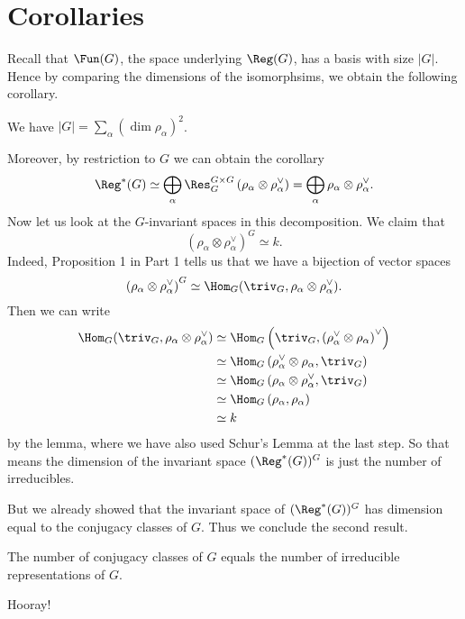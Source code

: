 \section{Corollaries}
Recall that $\Fun(G)$, the space underlying $\Reg(G)$, has a basis with size $\left\lvert G \right\rvert$.
Hence by comparing the dimensions of the isomorphsims, we obtain the following corollary.
\begin{theorem}
	We have $\left\lvert G \right\rvert = \sum_\alpha \left( \dim \rho_\alpha \right)^2$.
\end{theorem}
Moreover, by restriction to $G$ we can obtain the corollary
\[
	\Reg^\ast(G)
	\simeq \bigoplus_\alpha \Res_{G}^{G \times G} \left( \rho_\alpha \otimes \rho_\alpha^\vee \right)
	= \bigoplus_\alpha \rho_\alpha \otimes \rho_\alpha^\vee.
\]
Now let us look at the $G$-invariant spaces in this decomposition.
We claim that
\[ \left( \rho_\alpha \otimes \rho_\alpha^\vee \right)^G \simeq k. \]
Indeed, {Proposition 1} in {Part 1} tells us that we have a bijection of vector spaces
\[ \left( \rho_\alpha \otimes \rho_\alpha^\vee \right)^G \simeq 
	\Hom_G(\triv_G, \rho_\alpha \otimes \rho_\alpha^\vee). \]
Then we can write
\[
\begin{aligned}
	\Hom_G(\triv_G, \rho_\alpha \otimes \rho_\alpha^\vee)
	&\simeq 
	\Hom_G\left(\triv_G, \left( \rho_\alpha^\vee \otimes \rho_\alpha \right)^\vee \right) \\
	&\simeq \Hom_G\left(\rho_\alpha^\vee \otimes \rho_\alpha, \triv_G \right) \\
	&\simeq \Hom_G\left(\rho_\alpha \otimes \rho_\alpha^\vee, \triv_G \right) \\
	&\simeq \Hom_G\left(\rho_\alpha, \rho_\alpha \right) \\
	&\simeq k
\end{aligned}
\]
by the lemma, where we have also used Schur's Lemma at the last step.
So that means the dimension of the invariant space $(\Reg^\ast (G))^G$
is just the number of irreducibles.

But we already showed that the invariant space of $(\Reg^\ast (G))^G$
has dimension equal to the conjugacy classes of $G$. Thus we conclude the second result.
\begin{theorem}
	The number of conjugacy classes of $G$ equals
	the number of irreducible representations of $G$.
\end{theorem}
Hooray!
